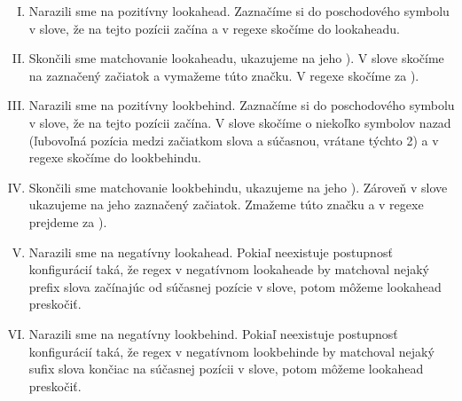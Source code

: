 \begin{df}
\begin{enumerate}[I.]
\item Narazili sme na pozitívny lookahead. Zaznačíme si do poschodového symbolu v slove, že na tejto pozícii začína a v regexe skočíme do lookaheadu.
\item Skončili sme matchovanie lookaheadu, ukazujeme na jeho ). V slove skočíme na zaznačený začiatok a vymažeme túto značku. V regexe skočíme za ).
\item Narazili sme na pozitívny lookbehind. Zaznačíme si do poschodového symbolu v slove, že na tejto pozícii začína. V slove skočíme o niekoľko symbolov nazad (ľubovoľná pozícia medzi začiatkom slova a súčasnou, vrátane týchto 2) a v regexe skočíme do lookbehindu.
\item Skončili sme matchovanie lookbehindu, ukazujeme na jeho ). Zároveň v slove ukazujeme na jeho zaznačený začiatok. Zmažeme túto značku a v regexe prejdeme za ).
\item Narazili sme na negatívny lookahead. Pokiaľ neexistuje postupnosť konfigurácií taká, že regex v negatívnom lookaheade by matchoval nejaký prefix slova začínajúc od súčasnej pozície v slove, potom môžeme lookahead preskočiť.
\item Narazili sme na negatívny lookbehind. Pokiaľ neexistuje postupnosť konfigurácií taká, že regex v negatívnom lookbehinde by matchoval nejaký sufix slova končiac na súčasnej pozícii v slove, potom môžeme lookahead preskočiť.

\end{enumerate}


\end{df}
